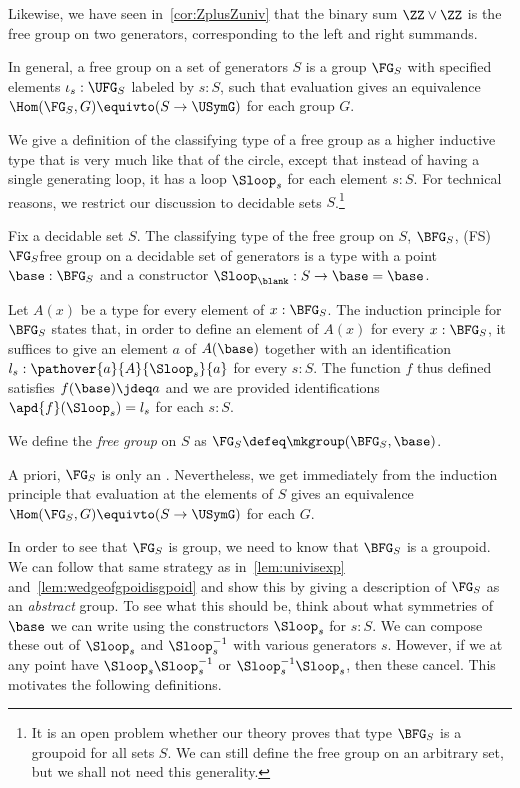 Likewise, we have seen in~\cref{cor:ZplusZuniv} that the binary sum $\ZZ \vee \ZZ$
is the free group on two generators, corresponding to the left and right summands.

In general, a free group on a set of generators $S$ is a group $\FG_S$ with
specified elements $\iota_s:\UFG_S$ labeled by $s:S$,
such that evaluation gives an equivalence $\Hom(\FG_S,G) \equivto (S \to \USymG)$
for each group $G$.

We give a definition of the classifying type of a free group
as a higher inductive type that is very much like that of the circle,
except that instead of having a single generating loop,
it has a loop $\Sloop_s$ for each element $s:S$.
For technical reasons, we restrict our discussion to decidable sets $S$.\footnote{%
  It is an open problem whether our theory proves that type $\BFG_S$
  is a groupoid for all sets $S$.
  We can still define the free group on an arbitrary set,
  but we shall not need this generality.}
\begin{definition}
  \label{def:bfree}
  Fix a decidable set $S$.
  The classifying type of the free group on $S$, $\BFG_S$,%
  \glossary(FS){$\protect\FG_S$}{free group on a decidable set of generators}
  is a type with a point $\base : \BFG_S$ and
  a constructor ${\Sloop_\blank} : S \to \base=\base$.

  Let $A(x)$ be a type for every element of $x:\BFG_S$.
  The induction principle for $\BFG_S$ states that,
  in order to define an element of $A(x)$ for every $x:\BFG_S$,
  it suffices to give an element $a$ of $A(\base)$ together
  with an identification $l_s:\pathover{a}{A}{\Sloop_s}{a}$
  for every $s:S$.
  The function $f$ thus defined satisfies $f(\base)\jdeq a$
  and we are provided identifications $\apd{f}(\Sloop_s)=l_s$ for each $s:S$.

  We define the \emph{free group} on $S$ as $\FG_S \defeq \mkgroup(\BFG_S,\base)$.
\end{definition}

A priori, $\FG_S$ is only an \inftygp.
Nevertheless, we get immediately from the induction principle
that evaluation at the elements of $S$
gives an equivalence $\Hom(\FG_S,G) \equivto (S \to \USymG)$ for each
\inftygp $G$.

In order to see that $\FG_S$ is group,
we need to know that $\BFG_S$ is a groupoid.
We can follow that same strategy as in~\cref{lem:univisexp}
and~\cref{lem:wedgeofgpoidisgpoid}
and show this by giving a description of $\FG_S$ as an \emph{abstract} group.
To see what this should be, think about what symmetries of $\base$
we can write using the constructors $\Sloop_s$ for $s:S$.
We can compose these out of $\Sloop_s$ and $\Sloop_s^{-1}$
with various generators $s$.
However, if we at any point have $\Sloop_s\Sloop_s^{-1}$ or $\Sloop_s^{-1}\Sloop_s$,
then these cancel.
This motivates the following definitions.

